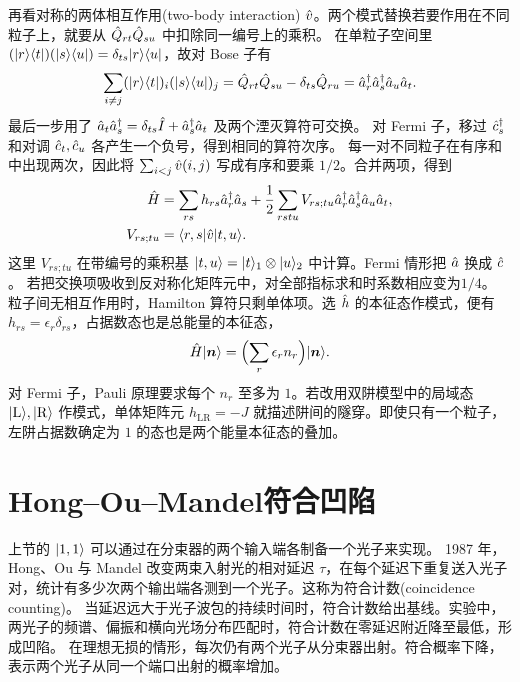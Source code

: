 再看对称的两体相互作用(two-body interaction) $\hat{v}$。两个模式替换若要作用在不同粒子上，就要从 $\hat{Q}_{rt}\hat{Q}_{su}$ 中扣除同一编号上的乘积。
在单粒子空间里 $(\lvert r\rangle\langle t\rvert)(\lvert s\rangle\langle u\rvert) = \delta_{ts}\lvert r\rangle\langle u\rvert$，故对 Bose 子有
\[
    \sum_{i\ne j}(\lvert r\rangle\langle t\rvert)_i(\lvert s\rangle\langle u\rvert)_j
       = \hat{Q}_{rt}\hat{Q}_{su} - \delta_{ts}\hat{Q}_{ru}
       = \hat{a}_r^\dagger\hat{a}_s^\dagger\hat{a}_u\hat{a}_t .
\]
最后一步用了 $\hat{a}_t\hat{a}_s^\dagger = \delta_{ts}\hat{I} + \hat{a}_s^\dagger\hat{a}_t$ 及两个湮灭算符可交换。
对 Fermi 子，移过 $\hat{c}_s^\dagger$ 和对调 $\hat{c}_t,\hat{c}_u$ 各产生一个负号，得到相同的算符次序。
每一对不同粒子在有序和中出现两次，因此将 $\textstyle \sum_{i<j}\hat{v}(i,j)$ 写成有序和要乘 $1/2$。合并两项，得到
\begin{subequations}
    \begin{align}
        \hat{H} &= \sum_{rs}h_{rs}\hat{a}_r^\dagger \hat{a}_s
        + \frac12\sum_{rstu}V_{rs;tu}\hat{a}_r^\dagger \hat{a}_s^\dagger \hat{a}_u \hat{a}_t,\\
        V_{rs;tu} &= \langle r,s\vert\hat{v}\vert t,u\rangle.
    \end{align}
\end{subequations}
这里 $V_{rs;tu}$ 在带编号的乘积基 $\lvert t,u\rangle = \lvert t\rangle_1 \otimes \lvert u\rangle_2$ 中计算。Fermi 情形把 $\hat{a}$ 换成 $\hat{c}$。
若把交换项吸收到反对称化矩阵元中，对全部指标求和时系数相应变为$1/4$。
粒子间无相互作用时，Hamilton 算符只剩单体项。选 $\hat{h}$ 的本征态作模式，便有 $h_{rs} = \epsilon_r\delta_{rs}$，占据数态也是总能量的本征态，
\begin{equation}\label{eq:qm-occupation-energy}
    \hat{H}\lvert\bm n\rangle = \Bigl(\sum_r \epsilon_r n_r\Bigr)\lvert\bm n\rangle.
\end{equation}
对 Fermi 子，Pauli 原理要求每个 $n_r$ 至多为 $1$。若改用双阱模型中的局域态 $\lvert\mathrm{L}\rangle,\lvert\mathrm{R}\rangle$ 作模式，单体矩阵元 $h_{\mathrm{LR}} = -J$ 就描述阱间的隧穿。即使只有一个粒子，左阱占据数确定为 $1$ 的态也是两个能量本征态的叠加。

\section{Hong--Ou--Mandel符合凹陷}
\label{sec:hom}
上节的 $\lvert1,1\rangle$ 可以通过在分束器的两个输入端各制备一个光子来实现。
1987 年，Hong、Ou 与 Mandel 改变两束入射光的相对延迟 $\tau$，在每个延迟下重复送入光子对，统计有多少次两个输出端各测到一个光子。这称为符合计数(coincidence counting)。
当延迟远大于光子波包的持续时间时，符合计数给出基线。实验中，两光子的频谱、偏振和横向光场分布匹配时，符合计数在零延迟附近降至最低，形成凹陷\cite{hom}。
在理想无损的情形，每次仍有两个光子从分束器出射。符合概率下降，表示两个光子从同一个端口出射的概率增加。

